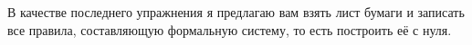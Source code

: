 В качестве последнего упражнения я предлагаю вам взять лист бумаги и записать
все правила, составляющую формальную систему, то есть построить её с нуля.

